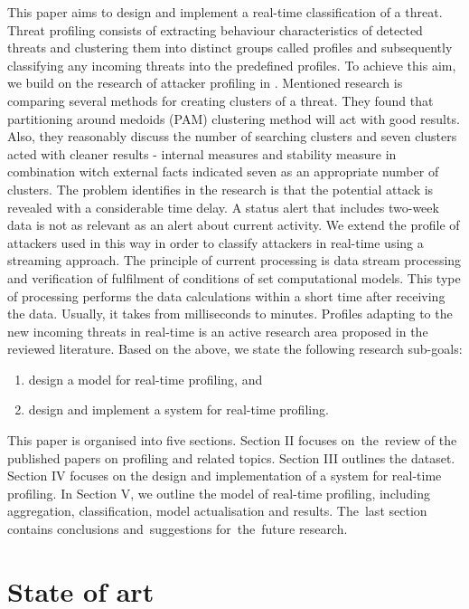 \documentclass[conference, a4paper]{IEEEtran}
\begin{document}
This paper aims to design and implement a real-time classification of a threat. Threat profiling consists of extracting behaviour characteristics of detected threats and clustering them into distinct groups called profiles and subsequently classifying any incoming threats into the predefined profiles. To achieve this aim, we build on the research of attacker profiling in \cite{bajtovs2018network}. Mentioned research is comparing several methods for creating clusters of a threat. They found that partitioning around medoids (PAM) clustering method will act with good results. Also, they reasonably discuss the number of searching clusters and seven clusters acted with cleaner results - internal measures and stability measure in combination witch external facts indicated seven as an appropriate number of clusters.
The problem identifies in the research is that the potential attack is revealed with a considerable time delay. A status alert that includes two-week data is not as relevant as an alert about current activity. We extend the profile of attackers used in this way in order to classify attackers in real-time using a streaming approach. The principle of current processing is data stream processing and verification of fulfilment of conditions of set computational models. This type of processing performs the data calculations within a short time after receiving the data. Usually, it takes from milliseconds to minutes. 
Profiles adapting to the new incoming threats in real-time is an active research area proposed in the reviewed literature.
Based on the above, we state the following research sub-goals:
    \begin{enumerate}
        \item design a model for real-time profiling, and
        \item design and implement a system for real-time profiling.
    \end{enumerate}

This paper is organised into five sections. Section II focuses on~the~review of the published papers on profiling and related topics. Section III outlines the dataset. Section IV focuses on the design and implementation of a system for real-time profiling. In Section V, we outline the model of real-time profiling, including aggregation, classification, model actualisation and results. The~last section contains conclusions and~suggestions for~the~future research.

\section{State of art}
\end{document}
